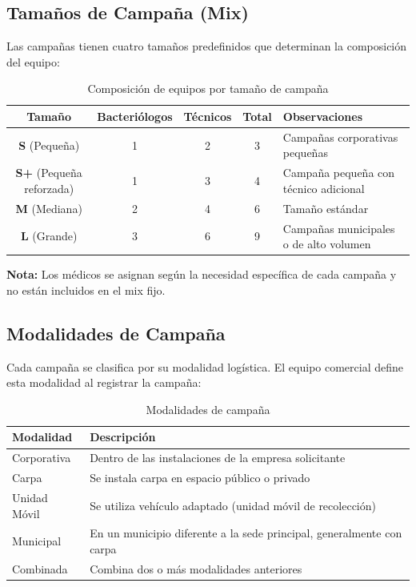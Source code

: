 \documentclass[10pt,a4paper]{article}
\begin{document}
\subsection{Tamaños de Campaña (Mix)}

Las campañas tienen cuatro tamaños predefinidos que determinan la composici\'{o}n del equipo:

\begin{table}[h!]
\centering
\begin{tabularx}{\textwidth}{|c|c|c|c|X|}
\hline
\textbf{Tamaño} & \textbf{Bacteri\'{o}logos} & \textbf{T\'{e}cnicos} & \textbf{Total} & \textbf{Observaciones} \\
\hline
\textbf{S} (Pequeña) & 1 & 2 & 3 & Campañas corporativas pequeñas \\
\hline
\textbf{S+} (Pequeña reforzada) & 1 & 3 & 4 & Campaña pequeña con t\'{e}cnico adicional \\
\hline
\textbf{M} (Mediana) & 2 & 4 & 6 & Tamaño est\'{a}ndar \\
\hline
\textbf{L} (Grande) & 3 & 6 & 9 & Campañas municipales o de alto volumen \\
\hline
\end{tabularx}
\caption{Composici\'{o}n de equipos por tamaño de campaña}
\end{table}

\textbf{Nota:} Los m\'{e}dicos se asignan seg\'{u}n la necesidad espec\'{i}fica de cada campaña y no est\'{a}n incluidos en el mix fijo.

\subsection{Modalidades de Campaña}

Cada campaña se clasifica por su modalidad log\'{i}stica. El equipo comercial define esta modalidad al registrar la campaña:

\begin{table}[h!]
\centering
\begin{tabularx}{\textwidth}{|l|X|}
\hline
\textbf{Modalidad} & \textbf{Descripci\'{o}n} \\
\hline
Corporativa & Dentro de las instalaciones de la empresa solicitante \\
\hline
Carpa & Se instala carpa en espacio p\'{u}blico o privado \\
\hline
Unidad M\'{o}vil & Se utiliza veh\'{i}culo adaptado (unidad m\'{o}vil de recolecci\'{o}n) \\
\hline
Municipal & En un municipio diferente a la sede principal, generalmente con carpa \\
\hline
Combinada & Combina dos o m\'{a}s modalidades anteriores \\
\hline
\end{tabularx}
\caption{Modalidades de campaña}
\end{table}
\end{document}
